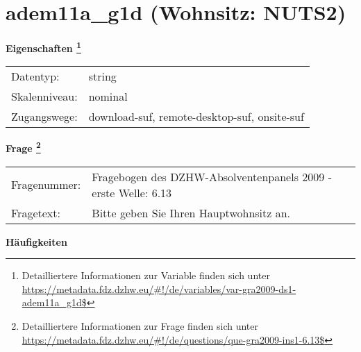 
    \setcounter{footnote}{0}

    \vspace*{-1.8cm}
	\section{adem11a\_g1d (Wohnsitz: NUTS2)}
	\label{section:adem11a_g1d}



    \vspace*{0.5cm}
    \noindent\textbf{Eigenschaften
	\footnote{Detailliertere Informationen zur Variable finden sich unter
		\url{https://metadata.fdz.dzhw.eu/\#!/de/variables/var-gra2009-ds1-adem11a_g1d$}}}\\
	\begin{tabularx}{\hsize}{@{}lX}
	Datentyp: & string \\
	Skalenniveau: & nominal \\
	Zugangswege: &
	  download-suf, 
	  remote-desktop-suf, 
	  onsite-suf
 \\
    \end{tabularx}



				\vspace*{0.5cm}
                \noindent\textbf{Frage
	                \footnote{Detailliertere Informationen zur Frage finden sich unter
		              \url{https://metadata.fdz.dzhw.eu/\#!/de/questions/que-gra2009-ins1-6.13$}}}\\
				\begin{tabularx}{\hsize}{@{}lX}
					Fragenummer: &
					  Fragebogen des DZHW-Absolventenpanels 2009 - erste Welle:
					  6.13
 \\
					Fragetext: & Bitte geben Sie Ihren Hauptwohnsitz an. \\
				\end{tabularx}





        		\vspace*{0.5cm}
                \noindent\textbf{Häufigkeiten}

